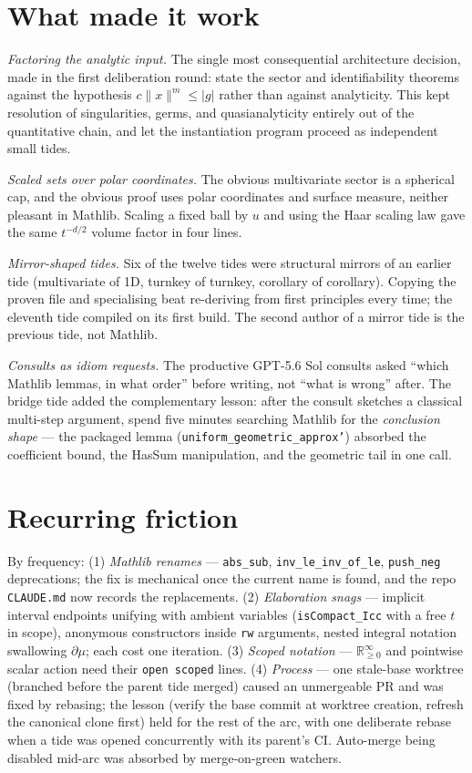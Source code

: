 \documentclass[11pt]{article}
\begin{document}
\section{What made it work}

\emph{Factoring the analytic input.} The single most consequential
architecture decision, made in the first deliberation round: state the
sector and identifiability theorems against the hypothesis
$c\|x\|^m \leq |g|$ rather than against analyticity. This kept resolution
of singularities, germs, and quasianalyticity entirely out of the
quantitative chain, and let the instantiation program proceed as
independent small tides.

\emph{Scaled sets over polar coordinates.} The obvious multivariate
sector is a spherical cap, and the obvious proof uses polar coordinates
and surface measure, neither pleasant in Mathlib. Scaling a fixed ball by
$u$ and using the Haar scaling law gave the same $t^{-d/2}$ volume factor
in four lines.

\emph{Mirror-shaped tides.} Six of the twelve tides were structural
mirrors of an earlier tide (multivariate of 1D, turnkey of turnkey,
corollary of corollary). Copying the proven file and specialising beat
re-deriving from first principles every time; the eleventh tide compiled
on its first build. The second author of a mirror tide is the previous
tide, not Mathlib.

\emph{Consults as idiom requests.} The productive GPT-5.6 Sol consults
asked ``which Mathlib lemmas, in what order'' before writing, not ``what
is wrong'' after. The bridge tide added the complementary lesson: after
the consult sketches a classical multi-step argument, spend five minutes
searching Mathlib for the \emph{conclusion shape} --- the packaged lemma
(\texttt{uniform\_geometric\_approx'}) absorbed the coefficient bound,
the HasSum manipulation, and the geometric tail in one call.

\section{Recurring friction}

By frequency: (1) \emph{Mathlib renames} --- \texttt{abs\_sub},
\texttt{inv\_le\_inv\_of\_le}, \texttt{push\_neg} deprecations; the fix
is mechanical once the current name is found, and the repo
\texttt{CLAUDE.md} now records the replacements. (2) \emph{Elaboration
snags} --- implicit interval endpoints unifying with ambient variables
(\texttt{isCompact\_Icc} with a free $t$ in scope), anonymous
constructors inside \texttt{rw} arguments, nested integral notation
swallowing $\partial\mu$; each cost one iteration. (3) \emph{Scoped
notation} --- $\mathbb{R}_{\geq 0}^\infty$ and pointwise scalar action
need their \texttt{open scoped} lines. (4) \emph{Process} --- one
stale-base worktree (branched before the parent tide merged) caused an
unmergeable PR and was fixed by rebasing; the lesson (verify the base
commit at worktree creation, refresh the canonical clone first) held for
the rest of the arc, with one deliberate rebase when a tide was opened
concurrently with its parent's CI. Auto-merge being disabled mid-arc was
absorbed by merge-on-green watchers.
\end{document}
